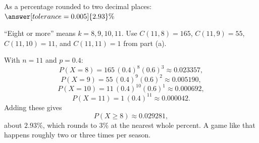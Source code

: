 \documentclass[12pt]{ximera}
\begin{document}
\begin{problem}
\begin{prompt}
As a percentage rounded to two decimal places: $\answer[tolerance=0.005]{2.93}\%$

\begin{hint}
``Eight or more'' means $k=8,9,10,11$. Use $C(11,8)=165$, $C(11,9)=55$,
$C(11,10)=11$, and $C(11,11)=1$ from part (a).
\end{hint}

\begin{feedback}
With $n=11$ and $p=0.4$:
\[
P(X=8)=165\,(0.4)^8(0.6)^3 \approx 0.023357,
\]
\[
P(X=9)=55\,(0.4)^9(0.6)^2 \approx 0.005190,
\]
\[
P(X=10)=11\,(0.4)^{10}(0.6)^1 \approx 0.000692,
\]
\[
P(X=11)=1\,(0.4)^{11} \approx 0.000042.
\]
Adding these gives
\[
P(X\ge 8)\approx 0.029281,
\]
about $2.93\%$, which rounds to $3\%$ at the nearest whole percent. A game like that
happens roughly two or three times per season.
\end{feedback}
\end{prompt}
\end{problem}
\end{document}
